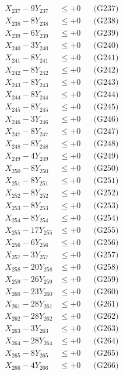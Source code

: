 \documentclass[a4paper,10pt]{article}
\begin{document}
{\begin{align}
X_{237} - 9Y_{237} &\leq +0 && \text{(G237)} \\
X_{238} - 8Y_{238} &\leq +0 && \text{(G238)} \\
X_{239} - 6Y_{239} &\leq +0 && \text{(G239)} \\
X_{240} - 3Y_{240} &\leq +0 && \text{(G240)} \\
X_{241} - 8Y_{241} &\leq +0 && \text{(G241)} \\
X_{242} - 8Y_{242} &\leq +0 && \text{(G242)} \\
X_{243} - 8Y_{243} &\leq +0 && \text{(G243)} \\
X_{244} - 8Y_{244} &\leq +0 && \text{(G244)} \\
X_{245} - 8Y_{245} &\leq +0 && \text{(G245)} \\
\allowbreak
X_{246} - 3Y_{246} &\leq +0 && \text{(G246)} \\
X_{247} - 8Y_{247} &\leq +0 && \text{(G247)} \\
X_{248} - 8Y_{248} &\leq +0 && \text{(G248)} \\
X_{249} - 4Y_{249} &\leq +0 && \text{(G249)} \\
X_{250} - 8Y_{250} &\leq +0 && \text{(G250)} \\
X_{251} - 8Y_{251} &\leq +0 && \text{(G251)} \\
X_{252} - 8Y_{252} &\leq +0 && \text{(G252)} \\
X_{253} - 8Y_{253} &\leq +0 && \text{(G253)} \\
X_{254} - 8Y_{254} &\leq +0 && \text{(G254)} \\
X_{255} - 17Y_{255} &\leq +0 && \text{(G255)} \\
\allowbreak
X_{256} - 6Y_{256} &\leq +0 && \text{(G256)} \\
X_{257} - 3Y_{257} &\leq +0 && \text{(G257)} \\
X_{258} - 20Y_{258} &\leq +0 && \text{(G258)} \\
X_{259} - 26Y_{259} &\leq +0 && \text{(G259)} \\
X_{260} - 23Y_{260} &\leq +0 && \text{(G260)} \\
X_{261} - 28Y_{261} &\leq +0 && \text{(G261)} \\
X_{262} - 28Y_{262} &\leq +0 && \text{(G262)} \\
X_{263} - 3Y_{263} &\leq +0 && \text{(G263)} \\
X_{264} - 28Y_{264} &\leq +0 && \text{(G264)} \\
X_{265} - 8Y_{265} &\leq +0 && \text{(G265)} \\
\allowbreak
X_{266} - 4Y_{266} &\leq +0 && \text{(G266)} \\

\end{align}}
\end{document}
